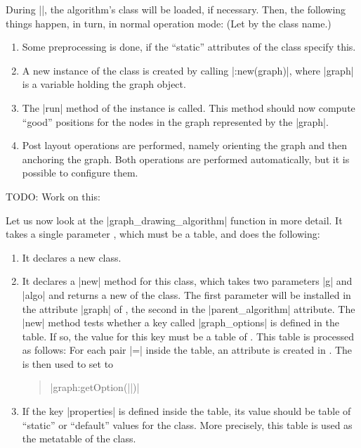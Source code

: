 During |\pgfgdendscope|, the algorithm's class will be loaded, if
necessary. Then, the following things happen, in turn, in normal
operation mode: (Let  by the class name.)

\begin{enumerate}
\item Some preprocessing is done, if the ``static'' attributes of the
  class specify this.
\item A new instance of the class is created by calling
  |:new(graph)|, where |graph| is a variable holding the
  graph object. 
\item The |run| method of the instance is called. This method should now
  compute ``good'' positions for the nodes in the graph represented by
  the |graph|.
\item Post layout operations are performed, namely orienting the
  graph and then anchoring the graph. Both operations are performed
  automatically, but it is possible to configure them.
\end{enumerate}

TODO: Work on this:

Let us now look at the |graph_drawing_algorithm| function in more
detail. It takes a single parameter , which must be a
table, and does the following:

\begin{enumerate}
\item It declares a new class.
\item It declares a |new| method for this class, which takes two
  parameters |g| and |algo| and returns a new  of the
  class. The first parameter will be installed in the attribute
  |graph| of , the second in the |parent_algorithm|
  attribute. The |new| method tests whether a key called 
  |graph_options| is defined in the  table. If so, the
  value for this key must be a table of . This table is
  processed as follows: For each pair  |=| 
  inside the  table, an attribute  is created
  in . The  is then used to set 
  to 
  \begin{quote}
    |graph:getOption(||)|
  \end{quote}
\item If the key |properties| is defined inside the  table,
  its value should be table of ``static'' or ``default'' values for
  the class. More precisely, this table is used as the metatable of
  the class.
\end{enumerate}

